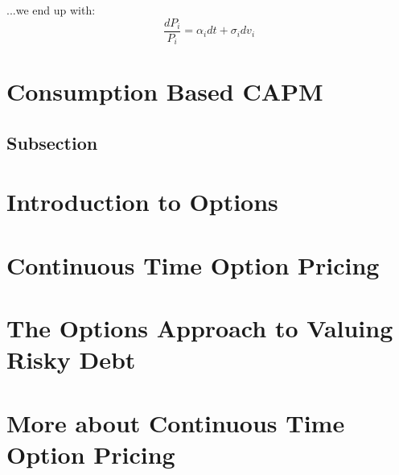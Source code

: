 \documentclass[
14pt,notheorems,hyperref={pdfauthor=whatever}
]{beamer}
\begin{document}
\begin{frame}
...we end up with:\\
\[ \frac{dP_i}{P_i} = \alpha_i dt + \sigma_i dv_i \]
\end{frame}

\section{Consumption Based CAPM}
\subsection{Subsection}

\section{Introduction to Options}


\section{Continuous Time Option Pricing}

\section{The Options Approach to Valuing Risky Debt}


\section{More about Continuous Time Option Pricing}
\end{document}
